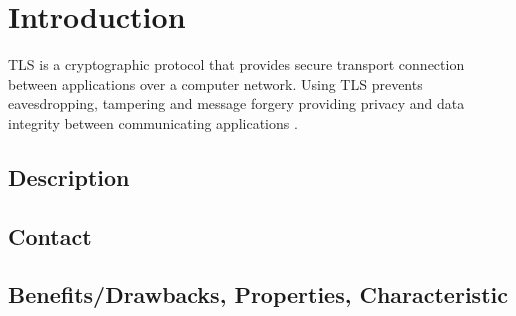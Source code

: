 \chapter{Introduction}
\label{chap:introduction}

TLS is a cryptographic protocol that provides secure transport connection between applications over a computer network. Using TLS prevents eavesdropping, tampering and message forgery providing privacy and data integrity between communicating applications \cite{RFC5246}. 

\section{Description}
\label{sec:description}


\section{Contact}
\label{sec:introduction_contact}


\section{Benefits/Drawbacks, Properties, Characteristic}
\label{sec:introduction_suggestions}



